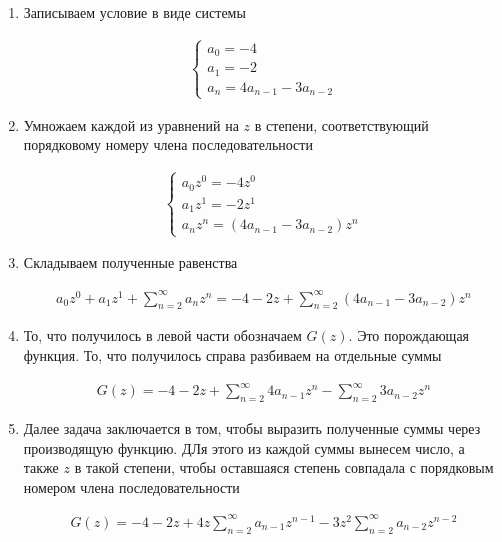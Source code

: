 \begin{enumerate}
  \item Записываем условие в виде системы
  
  \begin{align*}
    \begin{cases}
      a_{0} = -4 \\
      a_{1} = -2 \\
      a_{n} = 4 a_{n - 1} - 3 a_{n - 2}
    \end{cases}
  \end{align*}

  \item Умножаем каждой из уравнений на \(z\) в степени, соответствующий
  порядковому номеру члена последовательности

  \begin{align*}
    \begin{cases}
      a_{0} z^{0} = -4 z^{0} \\
      a_{1} z^{1} = -2 z^{1} \\
      a_{n} z^{n} = (4 a_{n - 1} - 3 a_{n - 2}) z^{n}
    \end{cases}
  \end{align*}

  \item Складываем полученные равенства
  
  \begin{align*}
    a_{0} z^{0} + a_{1} z^{1} + \sum_{n = 2}^{\infty} a_{n} z^{n} =
    -4 - 2z + \sum_{n = 2}^{\infty} (4 a_{n - 1} - 3 a_{n - 2}) z^{n}
  \end{align*}

  \item То, что получилось в левой части обозначаем \(G(z)\). Это порождающая
  функция. То, что получилось справа разбиваем на отдельные суммы

  \begin{align*}
    G(z) = -4 - 2z + \sum_{n = 2}^{\infty} 4 a_{n - 1} z^{n} - 
      \sum_{n = 2}^{\infty} 3 a_{n - 2} z^{n}
  \end{align*}

  \item Далее задача заключается в том, чтобы выразить полученные суммы через 
  производящую функцию. ДЛя этого из каждой суммы вынесем число, а также \(z\) в
  такой степени, чтобы оставшаяся степень совпадала с порядковым номером члена
  последовательности

  \begin{align*}
    G(z) = -4 - 2z + 4z \sum_{n = 2}^{\infty} a_{n - 1} z^{n - 1} - 
      3 z^{2} \sum_{n = 2}^{\infty} a_{n - 2} z^{n - 2}
  \end{align*}


\end{enumerate}

